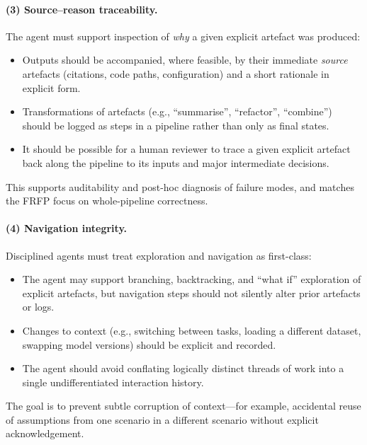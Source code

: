 \paragraph{(3) Source--reason traceability.}
The agent must support inspection of \emph{why} a given explicit artefact was produced:
\begin{itemize}
  \item Outputs should be accompanied, where feasible, by their immediate \emph{source} artefacts (citations, code paths, configuration) and a short rationale in explicit form.
  \item Transformations of artefacts (e.g., ``summarise'', ``refactor'', ``combine'') should be logged as steps in a pipeline rather than only as final states.
  \item It should be possible for a human reviewer to trace a given explicit artefact back along the pipeline to its inputs and major intermediate decisions.
\end{itemize}
This supports auditability and post-hoc diagnosis of failure modes, and matches the FRFP focus on whole-pipeline correctness.

\paragraph{(4) Navigation integrity.}
Disciplined agents must treat exploration and navigation as first-class:
\begin{itemize}
  \item The agent may support branching, backtracking, and ``what if'' exploration of explicit artefacts, but navigation steps should not silently alter prior artefacts or logs.
  \item Changes to context (e.g., switching between tasks, loading a different dataset, swapping model versions) should be explicit and recorded.
  \item The agent should avoid conflating logically distinct threads of work into a single undifferentiated interaction history.
\end{itemize}
The goal is to prevent subtle corruption of context---for example, accidental reuse of assumptions from one scenario in a different scenario without explicit acknowledgement.

